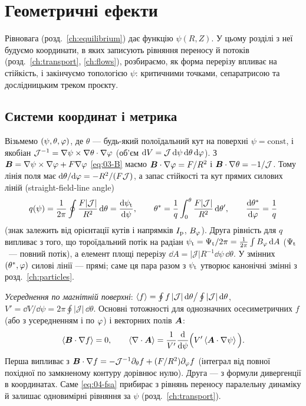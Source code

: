 \chapter{Геометричні ефекти}\label{ch:geometry}

Рівновага (розд.~\ref{ch:equilibrium}) дає функцію $\psi(R,Z)$. У цьому розділі з неї будуємо координати, в яких записують рівняння переносу й потоків (розд.~\ref{ch:transport}, \ref{ch:flows}), розбираємо, як форма перерізу впливає на стійкість, і закінчуємо топологією $\psi$: критичними точками, сепаратрисою та дослідницьким треком проєкту.

\section{Системи координат і метрика}\label{sec:04-coords}

\begin{outofcorpus}
Візьмемо $(\psi,\theta,\varphi)$, де $\theta$ --- будь-який полоїдальний кут на поверхні $\psi=\text{const}$, і якобіан $\mathcal{J}^{-1}=\nabla\psi\times\nabla\theta\cdot\nabla\varphi$ (об'єм $\mathrm{d} V=\mathcal{J}\,\mathrm{d}\psi\,\mathrm{d}\theta\,\mathrm{d}\varphi$). З $\bm{B}=\nabla\psi\times\nabla\varphi+F\nabla\varphi$ \eqref{eq:03-B} маємо $\bm{B}\cdot\nabla\varphi=F/R^2$ і $\bm{B}\cdot\nabla\theta=-1/\mathcal{J}$. Тому лінія поля має $\mathrm{d}\theta/\mathrm{d}\varphi=-R^2/(F\mathcal{J})$, а запас стійкості та кут прямих силових ліній (straight-field-line angle)
\begin{equation}\label{eq:04-q}
q(\psi)=\frac{1}{2\pi}\oint\frac{F|\mathcal{J}|}{R^2}\,\mathrm{d}\theta=\frac{\mathrm{d}\psi_{\mathrm{t}}}{\mathrm{d}\psi},\qquad
\theta^{*}=\frac{1}{q}\int_0^{\theta}\frac{F|\mathcal{J}|}{R^2}\,\mathrm{d}\theta',\qquad \frac{\mathrm{d}\theta^{*}}{\mathrm{d}\varphi}=\frac1q
\end{equation}
(знак залежить від орієнтації кутів і напрямків $I_{\mathrm{p}}$, $B_{\varphi}$). Друга рівність для $q$ випливає з того, що тороїдальний потік на радіан $\psi_{\mathrm{t}}=\Psi_{\mathrm{t}}/2\pi=\frac{1}{2\pi}\int B_{\varphi}\,\mathrm{d} A$ ($\Psi_{\mathrm{t}}$~--- повний потік), а елемент площі перерізу $\dd A=|\mathcal{J}|R^{-1}\dd\psi\,\dd\theta$. У змінних $(\theta^{*},\varphi)$ силові лінії --- прямі; саме ця пара разом з $\psi_{\mathrm{t}}$ утворює канонічні змінні з розд.~\ref{ch:particles}.

\emph{Усереднення по магнітній поверхні}: $\left\langle f \right\rangle=\oint f\,|\mathcal{J}|\,\mathrm{d}\theta\big/\oint|\mathcal{J}|\,\mathrm{d}\theta$, $V'=\dd V/\dd\psi=2\pi\oint|\mathcal{J}|\,\dd\theta$. Основні тотожності для однозначних осесиметричних $f$ (або з усередненням і по $\varphi$) і векторних полів $\bm{A}$:
\begin{equation}\label{eq:04-fsa}
\left\langle \bm{B}\cdot\nabla f \right\rangle=0,\qquad \left\langle \nabla\cdot\bm{A} \right\rangle=\frac{1}{V'}\frac{\mathrm{d}}{\mathrm{d}\psi}\Big(V'\left\langle \bm{A}\cdot\nabla\psi \right\rangle\Big).
\end{equation}
Перша випливає з $\bm{B}\cdot\nabla f=-\mathcal{J}^{-1}\partial_\theta f+(F/R^2)\partial_\varphi f$ (інтеграл від повної похідної по замкненому контуру дорівнює нулю). Друга --- з формули дивергенції в координатах. Саме \eqref{eq:04-fsa} прибирає з рівнянь переносу паралельну динаміку й залишає одновимірні рівняння за $\psi$ (розд.~\ref{ch:transport}).
\end{outofcorpus}

